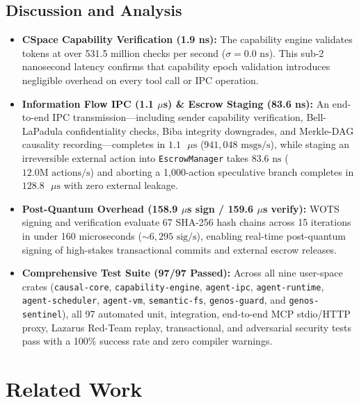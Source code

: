 \documentclass[10pt,journal,compsoc]{IEEEtran}
\theoremstyle{definition}
\begin{document}
\subsection{Discussion and Analysis}
\begin{itemize}
    \item \textbf{CSpace Capability Verification (1.9 ns):} The capability engine validates tokens at over 531.5 million checks per second ($\sigma = 0.0\text{ ns}$). This sub-2 nanosecond latency confirms that capability epoch validation introduces negligible overhead on every tool call or IPC operation.
    \item \textbf{Information Flow IPC (1.1 $\mu$s) \& Escrow Staging (83.6 ns):} An end-to-end IPC transmission—including sender capability verification, Bell-LaPadula confidentiality checks, Biba integrity downgrades, and Merkle-DAG causality recording—completes in $1.1\text{ }\mu\text{s}$ ($941,048\text{ msgs/s}$), while staging an irreversible external action into \texttt{EscrowManager} takes $83.6\text{ ns}$ ($12.0\text{M actions/s}$) and aborting a 1,000-action speculative branch completes in $128.8\text{ }\mu\text{s}$ with zero external leakage.
    \item \textbf{Post-Quantum Overhead (158.9 $\mu$s sign / 159.6 $\mu$s verify):} WOTS signing and verification evaluate 67 SHA-256 hash chains across 15 iterations in under 160 microseconds ($\sim 6,295\text{ sig/s}$), enabling real-time post-quantum signing of high-stakes transactional commits and external escrow releases.
    \item \textbf{Comprehensive Test Suite (97/97 Passed):} Across all nine user-space crates (\texttt{causal-core}, \texttt{capability-engine}, \texttt{agent-ipc}, \texttt{agent-runtime}, \texttt{agent-scheduler}, \texttt{agent-vm}, \texttt{semantic-fs}, \texttt{genos-guard}, and \texttt{genos-sentinel}), all 97 automated unit, integration, end-to-end MCP stdio/HTTP proxy, Lazarus Red-Team replay, transactional, and adversarial security tests pass with a 100\% success rate and zero compiler warnings.
\end{itemize}

\section{Related Work}
\label{sec:related}
\end{document}
